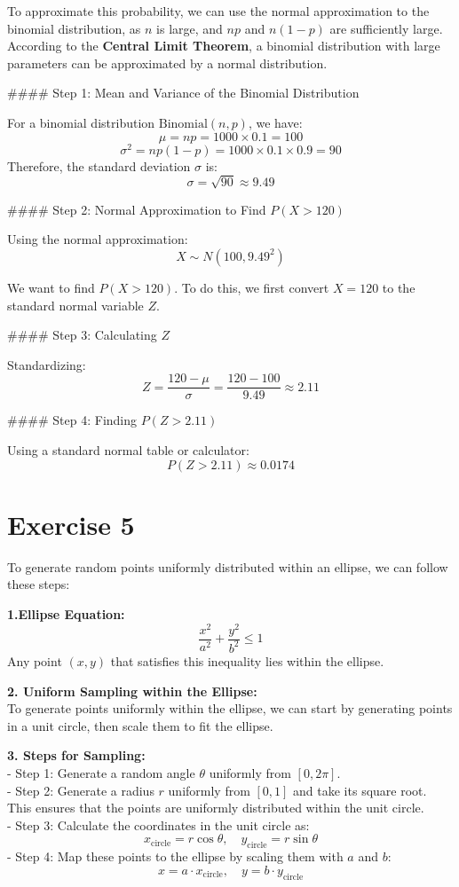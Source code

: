 \documentclass[a4paper,12pt]{article}
\begin{document}
To approximate this probability, we can use the normal approximation to the binomial distribution, as \( n \) is large, and \( np \) and \( n(1 - p) \) are sufficiently large. According to the \textbf{Central Limit Theorem}, a binomial distribution with large parameters can be approximated by a normal distribution.

#### Step 1: Mean and Variance of the Binomial Distribution

For a binomial distribution \( \text{Binomial}(n, p) \), we have:
\[
\mu = np = 1000 \times 0.1 = 100
\]
\[
\sigma^2 = np(1 - p) = 1000 \times 0.1 \times 0.9 = 90
\]
Therefore, the standard deviation \( \sigma \) is:
\[
\sigma = \sqrt{90} \approx 9.49
\]

#### Step 2: Normal Approximation to Find \( P(X > 120) \)

Using the normal approximation:
\[
X \sim N(100, 9.49^2)
\]

We want to find \( P(X > 120) \). To do this, we first convert \( X = 120 \) to the standard normal variable \( Z \).

#### Step 3: Calculating \( Z \)

Standardizing:
\[
Z = \frac{120 - \mu}{\sigma} = \frac{120 - 100}{9.49} \approx 2.11
\]

#### Step 4: Finding \( P(Z > 2.11) \)

Using a standard normal table or calculator:
\[
P(Z > 2.11) \approx 0.0174
\]
\newpage
\section{Exercise 5}
To generate random points uniformly distributed within an ellipse, we can follow these steps:

\textbf{1.Ellipse Equation:}
   \[
   \frac{x^2}{a^2} + \frac{y^2}{b^2} \leq 1
   \]
   Any point \( (x, y) \) that satisfies this inequality lies within the ellipse.

\textbf{2. Uniform Sampling within the Ellipse:}
\\To generate points uniformly within the ellipse, we can start by generating points in a unit circle, then scale them to fit the ellipse.

\textbf{3. Steps for Sampling:}
   \\- Step 1: Generate a random angle \( \theta \) uniformly from \( [0, 2\pi] \).
   \\- Step 2: Generate a radius \( r \) uniformly from \( [0, 1] \) and take its square root. This ensures that the points are uniformly distributed within the unit circle.
   \\- Step 3: Calculate the coordinates in the unit circle as:
     \[
     x_{\text{circle}} = r \cos \theta, \quad y_{\text{circle}} = r \sin \theta
     \]
   - Step 4: Map these points to the ellipse by scaling them with \( a \) and \( b \):
     \[
     x = a \cdot x_{\text{circle}}, \quad y = b \cdot y_{\text{circle}}
     \]
\end{document}

